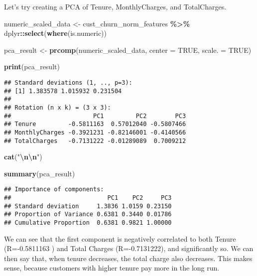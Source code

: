 \documentclass[
]{article}
\newenvironment{Shaded}{\begin{snugshade}}{\end{snugshade}}
\newcommand{\AttributeTok}[1]{\textcolor[rgb]{0.13,0.29,0.53}{#1}}
\newcommand{\ConstantTok}[1]{\textcolor[rgb]{0.56,0.35,0.01}{#1}}
\newcommand{\FunctionTok}[1]{\textcolor[rgb]{0.13,0.29,0.53}{\textbf{#1}}}
\newcommand{\NormalTok}[1]{#1}
\newcommand{\OtherTok}[1]{\textcolor[rgb]{0.56,0.35,0.01}{#1}}
\newcommand{\SpecialCharTok}[1]{\textcolor[rgb]{0.81,0.36,0.00}{\textbf{#1}}}
\newcommand{\StringTok}[1]{\textcolor[rgb]{0.31,0.60,0.02}{#1}}
\begin{document}
Let's try creating a PCA of Tenure, MonthlyCharges, and TotalCharges.

\begin{Shaded}
\begin{Highlighting}[]
\NormalTok{numeric\_scaled\_data }\OtherTok{\textless{}{-}}\NormalTok{ cust\_churn\_norm\_features }\SpecialCharTok{\%\textgreater{}\%}\NormalTok{ dplyr}\SpecialCharTok{::}\FunctionTok{select}\NormalTok{(}\FunctionTok{where}\NormalTok{(is.numeric))}

\NormalTok{pca\_result }\OtherTok{\textless{}{-}} \FunctionTok{prcomp}\NormalTok{(numeric\_scaled\_data, }\AttributeTok{center =} \ConstantTok{TRUE}\NormalTok{, }\AttributeTok{scale. =} \ConstantTok{TRUE}\NormalTok{)}

\FunctionTok{print}\NormalTok{(pca\_result)}
\end{Highlighting}
\end{Shaded}

\begin{verbatim}
## Standard deviations (1, .., p=3):
## [1] 1.383578 1.015932 0.231504
## 
## Rotation (n x k) = (3 x 3):
##                       PC1         PC2        PC3
## Tenure         -0.5811163  0.57012040 -0.5807466
## MonthlyCharges -0.3921231 -0.82146001 -0.4140566
## TotalCharges   -0.7131222 -0.01289089  0.7009212
\end{verbatim}

\begin{Shaded}
\begin{Highlighting}[]
\FunctionTok{cat}\NormalTok{(}\StringTok{"}\SpecialCharTok{\textbackslash{}n\textbackslash{}n}\StringTok{"}\NormalTok{)}
\end{Highlighting}
\end{Shaded}

\begin{Shaded}
\begin{Highlighting}[]
\FunctionTok{summary}\NormalTok{(pca\_result)}
\end{Highlighting}
\end{Shaded}

\begin{verbatim}
## Importance of components:
##                           PC1    PC2     PC3
## Standard deviation     1.3836 1.0159 0.23150
## Proportion of Variance 0.6381 0.3440 0.01786
## Cumulative Proportion  0.6381 0.9821 1.00000
\end{verbatim}

We can see that the first component is negatively correlated to both
Tenure (R=-0.5811163 ) and Total Charges (R=-0.7131222), and
significantly so. We can then say that, when tenure decreases, the total
charge also decreases. This makes sense, because customers with higher
tenure pay more in the long run.
\end{document}
